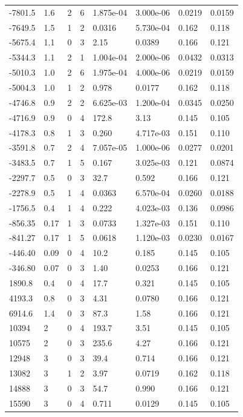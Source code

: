 \documentclass[preview]{standalone}
\begin{document}
{{\begin{tabular}{L{1.2cm}C{1.2cm} C{0.3cm}C{0.5cm} C{1.4cm}C{1.4cm} C{1.4cm}C{1.4cm}}
  -7801.5  &   1.6  & 2     &  6 &  1.875e-04  & 3.000e-06  & 0.0219 &  0.0159   \\ 
  -7649.5  &   1.5  & 1     &  2 &  0.0316  & 5.730e-04  & 0.162 &  0.118   \\ 
  -5675.4  &   1.1  & 0     &  3 &  2.15  & 0.0389  & 0.166 &  0.121   \\ 
  -5344.3  &   1.1  & 2     &  1 &  1.004e-04  & 2.000e-06  & 0.0432 &  0.0313   \\ 
  -5010.3  &   1.0  & 2     &  6 &  1.975e-04  & 4.000e-06  & 0.0219 &  0.0159   \\ 
  -5004.3  &   1.0  & 1     &  2 &  0.978  & 0.0177  & 0.162 &  0.118   \\ 
  -4746.8  &   0.9  & 2     &  2 &  6.625e-03  & 1.200e-04  & 0.0345 &  0.0250   \\ 
  -4716.9  &   0.9  & 0     &  4 &  172.8  & 3.13  & 0.145 &  0.105   \\ 
  -4178.3  &   0.8  & 1     &  3 &  0.260  & 4.717e-03  & 0.151 &  0.110   \\ 
  -3591.8  &   0.7  & 2     &  4 &  7.057e-05  & 1.000e-06  & 0.0277 &  0.0201   \\ 
  -3483.5  &   0.7  & 1     &  5 &  0.167  & 3.025e-03  & 0.121 &  0.0874   \\ 
  -2297.7  &   0.5  & 0     &  3 &  32.7  & 0.592  & 0.166 &  0.121   \\ 
  -2278.9  &   0.5  & 1     &  4 &  0.0363  & 6.570e-04  & 0.0260 &  0.0188   \\ 
  -1756.5  &   0.4  & 1     &  4 &  0.222  & 4.023e-03  & 0.136 &  0.0986   \\ 
  -856.35  &  0.17  & 1     &  3 &  0.0733  & 1.327e-03  & 0.151 &  0.110   \\ 
  -841.27  &  0.17  & 1     &  5 &  0.0618  & 1.120e-03  & 0.0230 &  0.0167   \\ 
  -446.40  &  0.09  & 0     &  4 &  10.2  & 0.185  & 0.145 &  0.105   \\ 
  -346.80  &  0.07  & 0     &  3 &  1.40  & 0.0253  & 0.166 &  0.121   \\ 
  1890.8  &   0.4  & 0     &  4 &  17.7  & 0.321  & 0.145 &  0.105   \\ 
  4193.3  &   0.8  & 0     &  3 &  4.31  & 0.0780  & 0.166 &  0.121   \\ 
  6914.6  &   1.4  & 0     &  3 &  87.3  & 1.58  & 0.166 &  0.121   \\ 
  10394  &     2  & 0     &  4 &  193.7  & 3.51  & 0.145 &  0.105   \\ 
  10575  &     2  & 0     &  3 &  235.6  & 4.27  & 0.166 &  0.121   \\ 
  12948  &     3  & 0     &  3 &  39.4  & 0.714  & 0.166 &  0.121   \\ 
  13082  &     3  & 1     &  2 &  3.97  & 0.0719  & 0.162 &  0.118   \\ 
  14888  &     3  & 0     &  3 &  54.7  & 0.990  & 0.166 &  0.121   \\ 
  15590  &     3  & 0     &  4 &  0.711  & 0.0129  & 0.145 &  0.105   \\ 
\hline 
\end{tabular} 

}}
\end{document}
